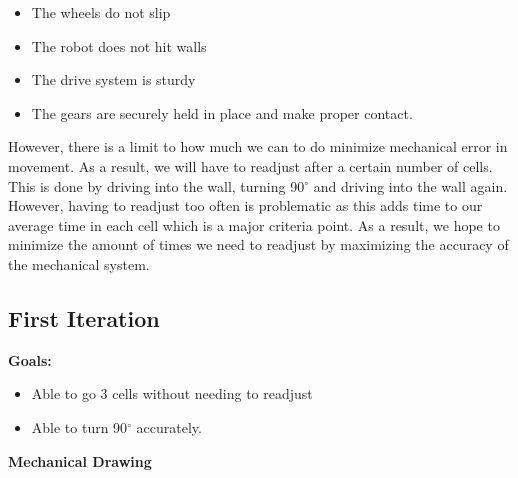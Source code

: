 \documentclass[11pt]{article}
\begin{document}
\begin{itemize}
\item The wheels do not slip
\item The robot does not hit walls
\item The drive system is sturdy 
\item The gears are securely held in place and make proper contact. 
\end{itemize}
However, there is a limit to how much we can to do minimize mechanical error in movement. As a result, we will have to readjust after a certain number of cells. This is done by driving into the wall, turning 90$^{\circ}$ and driving into the wall again. However, having to readjust too often is problematic as this adds time to our average time in each cell which is a major criteria point. As a result, we hope to minimize the amount of times we need to readjust by maximizing the accuracy of the mechanical system. 

\newpage

\subsection{First Iteration}
\textbf{Goals:}
\begin{itemize}
\item Able to go 3 cells without needing to readjust
\item Able to turn 90$^{\circ}$ accurately.
\end{itemize}
\textbf{Mechanical Drawing}\\
\end{document}
